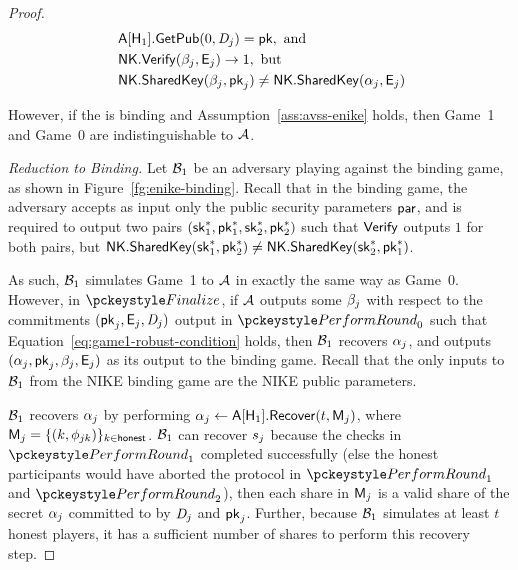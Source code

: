 \begin{proof}
\begin{align} \label{eq:game1-robust-condition}
  \begin{split}
    &\ \mathsf{A}[\mathsf{H}_1].\mathsf{GetPub}(0, \textit{D}_j) = \mathsf{pk}, \text{ and } \\
    &\ \mathsf{NK}.\mathsf{Verify}(\beta_j, \mathsf{E}_j) \rightarrow 1, \text{ but } \\
    &\ \mathsf{NK}.\mathsf{SharedKey}(\beta_j, \mathsf{pk}_j) \neq \mathsf{NK}.\mathsf{SharedKey}(\alpha_j, \mathsf{E}_j)
  \end{split}
\end{align}

However, if the \ENIKE is binding and Assumption~\ref{ass:avss-enike} holds,
then Game~1 and Game~0 are indistinguishable to $\mathcal{A}$.

\medskip

\noindent \textit{Reduction to \ENIKE Binding.}
Let $\mathcal{B}_1$ be an adversary playing against the \ENIKE binding game,
as shown in Figure~\ref{fg:enike-binding}.
Recall that in the binding game,
the adversary accepts as input only the public security parameters $\mathsf{par}$,
and is required to output two pairs $(\mathsf{sk}_1^*, \mathsf{pk}_1^*, \mathsf{sk}_2^*, \mathsf{pk}_2^*)$
such that $\mathsf{Verify}$ outputs $1$ for both pairs,
but $\mathsf{NK}.\mathsf{SharedKey}(\mathsf{sk}_1^*, \mathsf{pk}_2^*) \neq \mathsf{NK}.\mathsf{SharedKey}(\mathsf{sk}_2^*, \mathsf{pk}_1^*)$.

As such,
$\mathcal{B}_1$ simulates Game~1 to $\mathcal{A}$ in exactly the same way as Game~0.
However, in $\finalize$,
if $\mathcal{A}$ outputs some $\beta_j$ with respect to the commitments $(\mathsf{pk}_j, \mathsf{E}_j, \textit{D}_j)$ output in $\dkgkeygen_0$ such that Equation~\ref{eq:game1-robust-condition} holds,
then $\mathcal{B}_1$ recovers $\alpha_j$,
and outputs $(\alpha_j, \mathsf{pk}_j, \beta_j, \mathsf{E}_j)$ as its output to the \ENIKE binding game.
Recall that the only inputs to $\mathcal{B}_1$ from the NIKE binding game are the NIKE public parameters.

$\mathcal{B}_1$ recovers $\alpha_j$ by performing $\alpha_j \gets \mathsf{A}[\mathsf{H}_1].\mathsf{Recover}(t, \mathsf{M}_j)$,
where
$\mathsf{M}_j = \{(k,\phi_{jk}) \}_{k \in \mathsf{honest}}$.
$\mathcal{B}_1$ can recover $s_j$ because the checks in $\dkgkeygen_1$ completed successfully
(else the honest participants would have aborted the protocol in $\dkgkeygen_1$ and $\dkgkeygen_2$),
then each share in $\mathsf{M}_j$ is a valid share of the secret $\alpha_j$ committed to by $\textit{D}_j$ and $\mathsf{pk}_j$.
Further, because $\mathcal{B}_1$ simulates at least $t$ honest players,
it has a sufficient number of shares to perform this recovery step.


\end{proof}
